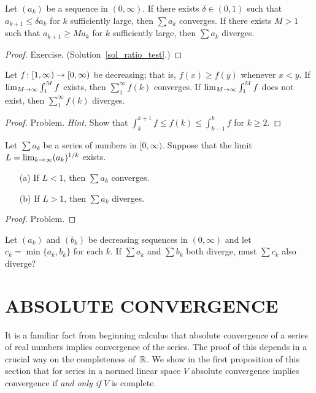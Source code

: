 \begin{prop}\label{ratio_test}
Let $(a_k)$ be a sequence in $(0,\infty)$.  If there exists $\delta \in (0,1)$ such that
$a_{k+1} \le \delta a_k$ for $k$ sufficiently large, then $\sum a_k$ converges.  If there
exists $M>1$ such that $a_{k+1} \ge Ma_k$ for $k$ sufficiently large, then $\sum a_k$
diverges.
\end{prop}

\begin{proof}  Exercise. (Solution~\ref{sol_ratio_test}.)
   \ns  \end{proof}

\begin{prop}
Let  $f\colon [1,\infty) \rightarrow [0,\infty)$ be decreasing; that is, $f(x) \ge f(y)$ whenever $x<
y$.  If $\lim_{M \rightarrow \infty}\int_1^M f$ exists, then $\sum_1^\infty f(k)$ converges. If
$\lim_{M\rightarrow\infty}\int_1^M f$ does not exist, then $\sum_1^\infty f(k)$ diverges.
\end{prop}

\begin{proof} Problem. \emph{Hint.}  Show that $\int_k^{k+1}f \le f(k) \le \int_{k-1}^kf$ for
$k \ge 2$.    \ns
\end{proof}

\begin{prop}
Let $\sum a_k$ be a series of numbers in $[0,\infty)$.  Suppose that the limit $L =
\lim_{k\rightarrow\infty}(a_k)^{1/k}$ exists.
 \begin{enumerate}
  \item[(a)] If $L < 1$, then $\sum a_k$ converges.
  \item[(b)] If $L > 1$, then $\sum a_k$ diverges.
 \end{enumerate}
\end{prop}

\begin{proof} Problem.  \ns   \end{proof}

\begin{prob} Let $(a_k)$ and $(b_k)$ be decreasing sequences in $(0,\infty)$ and let $c_k =
\min\{a_k,b_k\}$ for each $k$.  If $\sum a_k$ and $\sum b_k$ both diverge, must $\sum c_k$
also diverge?
\end{prob}







\section{ABSOLUTE CONVERGENCE}  It is a familiar fact from beginning calculus that absolute
convergence of a series of real numbers implies convergence of the series.  The proof of this
depends in a crucial way on the completeness of~$\mathbb{R}$.  We show in the first proposition of
this section that for series in a normed linear space $V$ absolute convergence implies
convergence if \emph{and only if} $V$ is complete.

